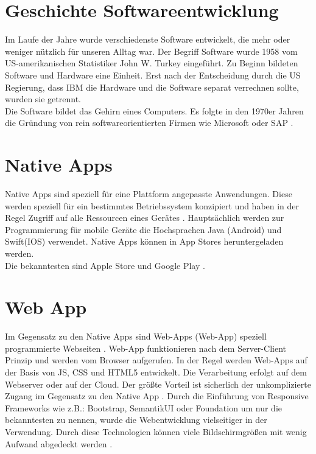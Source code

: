 \section{Geschichte Softwareentwicklung}
Im Laufe der Jahre wurde verschiedenste Software entwickelt, die mehr oder weniger nützlich für unseren Alltag war.
Der Begriff Software wurde 1958 vom US-amerikanischen Statistiker John W. Turkey eingeführt.
Zu Beginn bildeten Software und Hardware eine Einheit. Erst nach der Entscheidung durch die US Regierung, dass IBM die Hardware und die Software separat verrechnen sollte, wurden sie getrennt. \\
Die Software bildet das Gehirn eines Computers.
Es folgte in den 1970er Jahren die Gründung von rein softwareorientierten Firmen wie Microsoft oder SAP \cite{Microsoft} \cite{SAP}. 

\section{Native Apps}\label{chap:Native Apps}
Native Apps sind speziell für eine Plattform angepasste Anwendungen. 
Diese werden speziell für ein bestimmtes Betriebssystem konzipiert und haben in der Regel Zugriff auf alle Ressourcen eines Gerätes \cite{NativeApp}.
Hauptsächlich werden zur Programmierung für mobile Geräte die Hochsprachen Java (Android) und Swift(IOS) verwendet. Native Apps können in App Stores heruntergeladen  werden. \\Die bekanntesten sind Apple Store und Google Play \cite{Hochsprachen}.

\section{Web App}\label{chap:Webapplikationen}
Im Gegensatz zu den Native Apps sind \acl{Web-App}s (\acs{Web-App}) speziell programmierte Webseiten \cite{Hochsprachen}.
\acs{Web-App} funktionieren nach dem Server-Client Prinzip und werden vom Browser aufgerufen. In der Regel werden \acs{Web-App}s auf der Basis von \acs{JS}, \acs{CSS} und \acs{HTML}5 entwickelt. Die Verarbeitung erfolgt auf dem Webserver oder auf der Cloud. 
Der größte Vorteil ist sicherlich der unkomplizierte Zugang im Gegensatz zu den Native App \cite{WebApps}.
Durch die Einführung von Responsive Frameworks wie z.B.: Bootstrap, SemantikUI oder Foundation um nur die bekanntesten zu nennen, wurde die Webentwicklung vielseitiger in der Verwendung. Durch diese Technologien können viele Bildschirmgrößen mit wenig Aufwand abgedeckt werden \cite{CSS}. 


